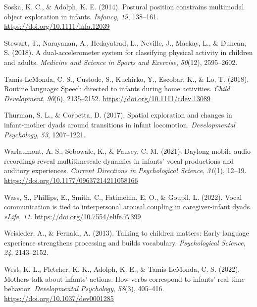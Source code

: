 \documentclass[
  man]{apa6}
\newlength{\cslhangindent}
\newlength{\cslentryspacingunit} %
\newenvironment{CSLReferences}[2] %
 {%
  \setlength{\parindent}{0pt}
  \ifodd #1
  \let\oldpar\par
  \def\par{\hangindent=\cslhangindent\oldpar}
  \fi
  \setlength{\parskip}{#2\cslentryspacingunit}
 }%
 {}
\begin{document}
\begin{CSLReferences}{1}{0}
\leavevmode{}%
Soska, K. C., \& Adolph, K. E. (2014). Postural position constrains multimodal object exploration in infants. \emph{Infancy}, \emph{19}, 138--161. \url{https://doi.org/10.1111/infa.12039}

\leavevmode{}%
Stewart, T., Narayanan, A., Hedayatrad, L., Neville, J., Mackay, L., \& Duncan, S. (2018). A dual-accelerometer system for classifying physical activity in children and adults. \emph{Medicine and Science in Sports and Exercise}, \emph{50}(12), 2595--2602.

\leavevmode{}%
Tamis-LeMonda, C. S., Custode, S., Kuchirko, Y., Escobar, K., \& Lo, T. (2018). Routine language: Speech directed to infants during home activities. \emph{Child Development}, \emph{90}(6), 2135--2152. \url{https://doi.org/10.1111/cdev.13089}

\leavevmode{}%
Thurman, S. L., \& Corbetta, D. (2017). Spatial exploration and changes in infant-mother dyads around transitions in infant locomotion. \emph{Developmental Psychology}, \emph{53}, 1207--1221.

\leavevmode{}%
Warlaumont, A. S., Sobowale, K., \& Fausey, C. M. (2021). Daylong mobile audio recordings reveal multitimescale dynamics in infants' vocal productions and auditory experiences. \emph{Current Directions in Psychological Science}, \emph{31}(1), 12--19. \url{https://doi.org/10.1177/09637214211058166}

\leavevmode{}%
Wass, S., Phillips, E., Smith, C., Fatimehin, E. O., \& Goupil, L. (2022). Vocal communication is tied to interpersonal arousal coupling in caregiver-infant dyads. \emph{{eLife}}, \emph{11}. \url{https://doi.org/10.7554/elife.77399}

\leavevmode{}%
Weisleder, A., \& Fernald, A. (2013). Talking to children matters: Early language experience strengthens processing and builds vocabulary. \emph{Psychological Science}, \emph{24}, 2143--2152.

\leavevmode{}%
West, K. L., Fletcher, K. K., Adolph, K. E., \& Tamis-LeMonda, C. S. (2022). Mothers talk about infants' actions: How verbs correspond to infants' real-time behavior. \emph{Developmental Psychology}, \emph{58}(3), 405--416. \url{https://doi.org/10.1037/dev0001285}


\end{CSLReferences}
\end{document}
